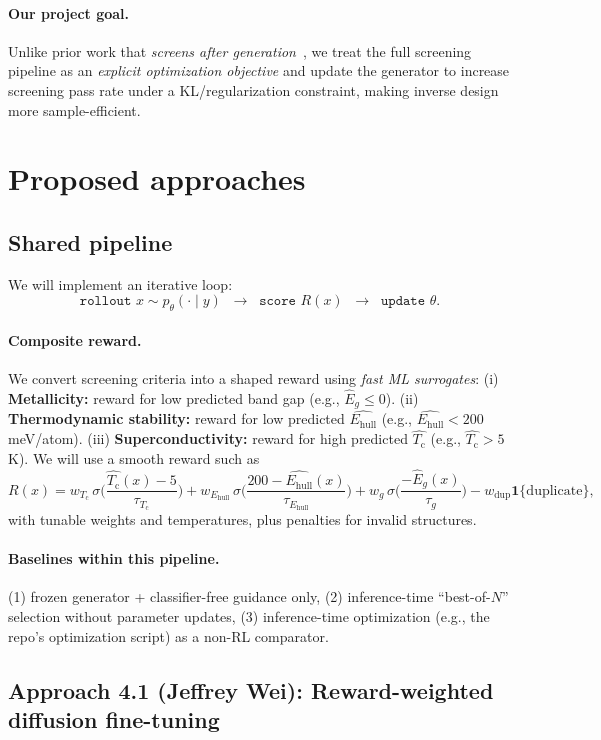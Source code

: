 \documentclass{article}
\newcommand{\Tc}{T_{\mathrm{c}}}
\newcommand{\Ehull}{E_{\mathrm{hull}}}
\begin{document}
\paragraph{Our project goal.}
Unlike prior work that \emph{screens after generation}~\citep{prakash2025guidedmatdiffusion}, we treat the full screening pipeline as an \emph{explicit optimization objective} and update the generator to increase screening pass rate under a KL/regularization constraint, making inverse design more sample-efficient.

\section{Proposed approaches}
\subsection{Shared pipeline}
We will implement an iterative loop:
\[
\texttt{rollout } x \sim p_{\theta}(\cdot \mid y) \;\;\rightarrow\;\; \texttt{score } R(x)\;\;\rightarrow\;\; \texttt{update } \theta.
\]
\paragraph{Composite reward.}
We convert screening criteria into a shaped reward using \emph{fast ML surrogates}: (i) \textbf{Metallicity:} reward for low predicted band gap (e.g., $\widehat{E}_g \le 0$). (ii) \textbf{Thermodynamic stability:} reward for low predicted $\widehat{\Ehull}$ (e.g., $\widehat{\Ehull} < 200$ meV/atom). (iii) \textbf{Superconductivity:} reward for high predicted $\widehat{\Tc}$ (e.g., $\widehat{\Tc} > 5$ K).
We will use a smooth reward such as
\[
R(x)=w_{\Tc}\,\sigma\!\Big(\frac{\widehat{\Tc}(x)-5}{\tau_{\Tc}}\Big)+
w_{\Ehull}\,\sigma\!\Big(\frac{200-\widehat{\Ehull}(x)}{\tau_{\Ehull}}\Big)+
w_{g}\,\sigma\!\Big(\frac{-\widehat{E}_g(x)}{\tau_g}\Big)
- w_{\mathrm{dup}}\mathbf{1}\{\text{duplicate}\},
\]
with tunable weights and temperatures, plus penalties for invalid structures.

\paragraph{Baselines within this pipeline.}
(1) frozen generator + classifier-free guidance only,
(2) inference-time ``best-of-$N$'' selection without parameter updates,
(3) inference-time optimization (e.g., the repo's optimization script) as a non-RL comparator.

\subsection{Approach 4.1 (Jeffrey Wei): Reward-weighted diffusion fine-tuning}
\end{document}
